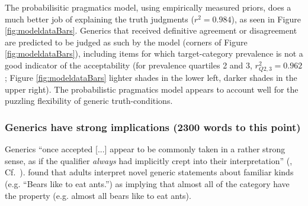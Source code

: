 \documentclass[10pt,letterpaper]{article}
\newcommand{\red}[1]{\textcolor{Red}{#1}}
\begin{document}
The probabilisitic pragmatics model, using empirically measured priors, does a much better job of explaining the truth judgments ($r^2=0.984$), as seen in Figure \ref{fig:modeldataBars}. 
Generics that received definitive agreement or disagreement are predicted to be judged as such by the model (corners of Figure \ref{fig:modeldataBars}), including items for which target-category prevalence is not a good indicator of the acceptability (for prevalence quartiles 2 and 3, $r_{Q2,3}^2=0.962$; Figure \ref{fig:modeldataBars} lighter shades in the lower left, darker shades in the upper right). 
The probabilistic pragmatics model appears to account well for the puzzling flexibility of generic truth-conditions.

\subsubsection{Generics have strong implications (2300 words to this point)} 

Generics ``once accepted [...] appear to be commonly taken in a rather strong sense, as if the qualifier \emph{always} had implicitly crept into their interpretation'' (, Cf.~). %
%
 found that adults interpret novel generic statements about familiar kinds (e.g. ``Bears like to eat ants.'') as implying that almost all of the category have the property (e.g. almost all bears like to eat ants).
\end{document}
